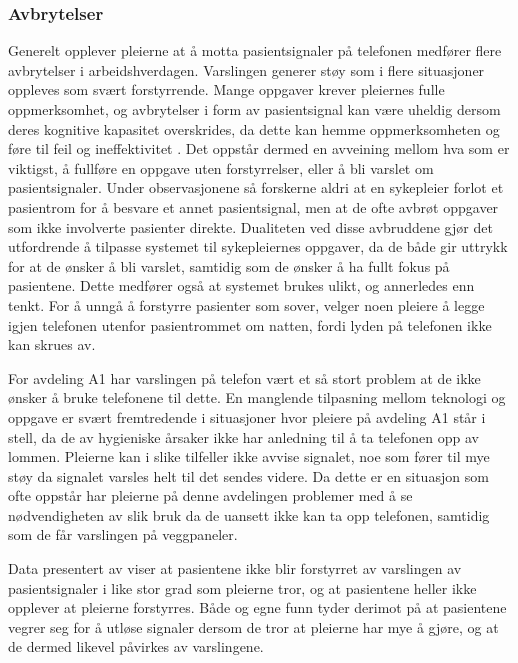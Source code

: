 \subsubsection{Avbrytelser}
Generelt opplever pleierne at å motta pasientsignaler på telefonen medfører flere avbrytelser i arbeidshverdagen. Varslingen generer støy som i flere situasjoner oppleves som svært forstyrrende. Mange oppgaver krever pleiernes fulle oppmerksomhet, og avbrytelser i form av pasientsignal kan være uheldig dersom deres kognitive kapasitet overskrides, da dette kan hemme oppmerksomheten og føre til feil og ineffektivitet \citep{Ebright10, Parker00}. Det oppstår dermed en avveining mellom hva som er viktigst, å fullføre en oppgave uten forstyrrelser, eller å bli varslet om pasientsignaler. Under observasjonene så forskerne aldri at en sykepleier forlot et pasientrom for å besvare et annet pasientsignal, men at de ofte avbrøt oppgaver som ikke involverte pasienter direkte. Dualiteten ved disse avbruddene gjør det utfordrende å tilpasse systemet til sykepleiernes oppgaver, da de både gir uttrykk for at de ønsker å bli varslet, samtidig som de ønsker å ha fullt fokus på pasientene. Dette medfører også at systemet brukes ulikt, og annerledes enn tenkt. For å unngå å forstyrre pasienter som sover, velger noen pleiere å legge igjen telefonen utenfor pasientrommet om natten, fordi lyden på telefonen ikke kan skrues av.

\noindent
For avdeling A1 har varslingen på telefon vært et så stort problem at de ikke ønsker å bruke telefonene til dette. En manglende tilpasning mellom teknologi og oppgave er svært fremtredende i situasjoner hvor pleiere på avdeling A1 står i stell, da de av hygieniske årsaker ikke har anledning til å ta telefonen opp av lommen. Pleierne kan i slike tilfeller ikke avvise signalet, noe som fører til mye støy da signalet varsles helt til det sendes videre. Da dette er en situasjon som ofte oppstår har pleierne på denne avdelingen problemer med å se nødvendigheten av slik bruk da de uansett ikke kan ta opp telefonen, samtidig som de får varslingen på veggpaneler.

\noindent
Data presentert av \citet{Rygh13} viser at pasientene ikke blir forstyrret av varslingen av pasientsignaler i like stor grad som pleierne tror, og at pasientene heller ikke opplever at pleierne forstyrres. Både \citet{Rygh13} og egne funn tyder derimot på at pasientene vegrer seg for å utløse signaler dersom de tror at pleierne har mye å gjøre, og at de dermed likevel påvirkes av varslingene.


